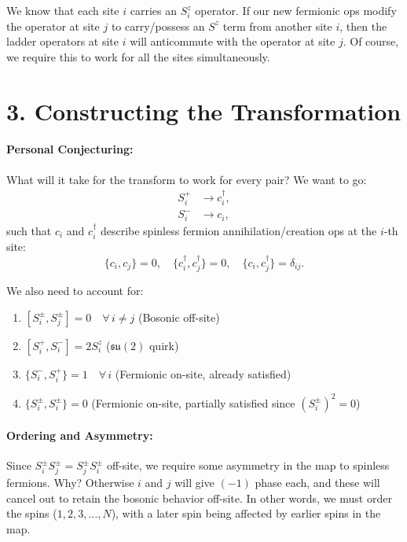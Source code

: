 \documentclass[11pt,a4paper]{article}
\begin{document}
We know that each site $i$ carries an $S_i^z$ operator. If our new fermionic ops modify the operator at site $j$ to carry/possess an $S^z$ term from another site $i$, then the ladder operators at site $i$ will anticommute with the operator at site $j$. Of course, we require this to work for all the sites simultaneously.


\section*{3. Constructing the Transformation}

\paragraph{Personal Conjecturing:}
What will it take for the transform to work for every pair? We want to go:
\begin{align}
    S_i^+ &\longrightarrow c_i^\dagger, \\
    S_i^- &\longrightarrow c_i,
\end{align}
such that $c_i$ and $c_i^\dagger$ describe spinless fermion annihilation/creation ops at the $i$-th site:
\begin{equation}
    \{c_i, c_j\} = 0, \quad \{c_i^\dagger, c_j^\dagger\} = 0, \quad \{c_i, c_j^\dagger\} = \delta_{ij}.
\end{equation}

We also need to account for:
\begin{enumerate}
    \item $[S_i^\pm, S_j^\pm] = 0 \quad \forall\, i \neq j$ (Bosonic off-site)
    \item $[S_i^+, S_i^-] = 2 S_i^z$ ($\mathfrak{su}(2)$ quirk)
    \item $\{S_i^-, S_i^+\} = 1 \quad \forall\, i$ (Fermionic on-site, already satisfied)
    \item $\{S_i^\pm, S_i^\pm\} = 0$ (Fermionic on-site, partially satisfied since $(S_i^\pm)^2 = 0$)
\end{enumerate}

\paragraph{Ordering and Asymmetry:}
Since $S_i^\pm S_j^\pm = S_j^\pm S_i^\pm$ off-site, we require some asymmetry in the map to spinless fermions. Why? Otherwise $i$ and $j$ will give $(-1)$ phase each, and these will cancel out to retain the bosonic behavior off-site. In other words, we must order the spins ($1, 2, 3, \dots, N$), with a later spin being affected by earlier spins in the map.
\end{document}
